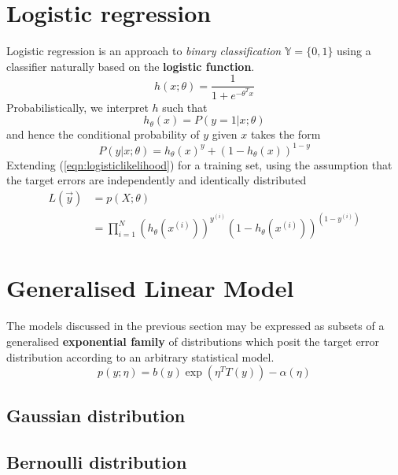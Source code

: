 \documentclass{article}
\theoremstyle{definition}
\theoremstyle{remark}
\begin{document}
\section{Logistic regression}
Logistic regression is an approach to \textit{binary classification} $\mathbb{Y} = \{0,1\}$ using a classifier naturally based on the \textbf{logistic function}.
\begin{equation}
  h{(x; \theta)} = \frac{1}{1+e^{-\theta^{T}x}}
  \label{eqn:logisticclassifier}
\end{equation}
Probabilistically, we interpret $h$ such that 
\begin{equation}
  h_{\theta}(x) = P(y = 1 | x; \theta) 
  \label{eqn:logisticprobabilistic}
\end{equation}
and hence the conditional probability of $y$ given $x$ takes the form
\begin{equation}
  P(y|x; \theta) = h_{\theta}{(x)}^{y} + {\left( 1 - h_{\theta}(x) \right)}^{1-y}
  \label{eqn:logisticlikelihood}
\end{equation}
Extending (\ref{eqn:logisticlikelihood}) for a training set, using the assumption that the target errors are independently and identically distributed 
\begin{align}
  L{(\vec{y})} &= p(X; \theta) \nonumber \\
  &= \prod_{i=1}^{N}{{\left( h_{\theta}(x^{(i)}) \right)}^{y^{(i)}}}{\left( 1 - h_{\theta}(x^{(i)}) \right)}^{(1-y^{(i)})} 
\end{align}

\section{Generalised Linear Model}
The models discussed in the previous section may be expressed as subsets of a generalised \textbf{exponential family} of distributions which posit the target error distribution according to an arbitrary statistical model.
\begin{equation}
  p{(y;\eta)} = b{(y)}\exp{(\eta^{T}T(y))-\alpha(\eta)}
  \label{eqn:exponentialfamily}
\end{equation}
\subsection{Gaussian distribution}
\subsection{Bernoulli distribution}
\end{document}
